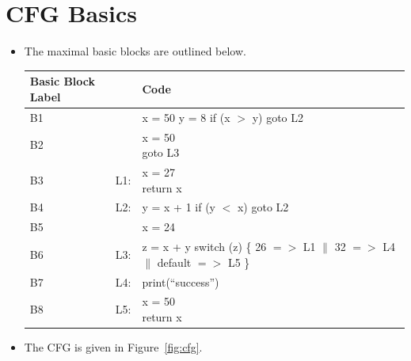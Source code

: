 \section{CFG Basics}

\begin{itemize}
 
\item The maximal basic blocks are outlined below. 


\begin{table}[!ht]
\centering
\begin{tabular}{l l l }
  \toprule
  \toprule
Basic Block Label & & Code \\
\midrule
B1 & & \shortstack[l]{x = 50 \\ y = 8 \\ if (x $>$ y) goto L2} \\
\midrule
B2 & & \shortstack[l]{x = 50 \\ goto L3} \\
\midrule
B3 & L1: & \shortstack[l]{x = 27 \\ return x}\\
\midrule
B4 & L2: & \shortstack[l]{y = x + 1 \\ if (y $<$ x) goto L2}\\
\midrule
B5 &  & x = 24\\
\midrule
B6 & L3: & \shortstack[l]{z = x + y \\ switch (z) \{ 26 $=>$ L1 $\|$ 32 $=>$ L4 $\|$ default $=>$ L5 \} } \\
\midrule
B7 & L4: & print(``success'') \\
\midrule
B8 & L5: & \shortstack[l]{x = 50\\return x}\\
\bottomrule
\end{tabular}
\end{table}

\item The CFG is given in Figure~\ref{fig:cfg}.
  

\end{itemize}
